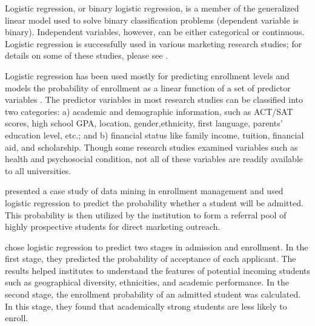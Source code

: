 \documentclass[12pt,english]{report}
\begin{document}
Logistic regression, or binary logistic regression, is a member of the generalized linear model used to solve binary classification problems (dependent variable is binary). Independent variables, however,  can be either categorical or continuous. %
Logistic regression is successfully used in various marketing research studies; for details on some of these studies, please see \citep{Hosmer2013}.

\vspace{0.15in}
Logistic regression has been used mostly for predicting enrollment levels and models the probability of enrollment as a linear function of a set of predictor variables \citep{lr_summary}. The predictor  variables in most research studies can be classified into two categories: a) academic and demographic information, such as ACT/SAT scores, high school GPA, location, gender,ethnicity, first language, parents' education level, etc.; and b) financial status like family income, tuition, financial aid, and scholarship. Though some research studies examined variables such as health and psychosocial condition, not all of these variables are readily available to all universities.

\citet{lr_1_chang} presented a case study of data mining in enrollment management and used logistic regression to predict the probability whether a student will be admitted. This probability is then utilized by the institution to form a referral pool of highly prospective students for direct marketing outreach.

\citet{lr_2} chose logistic regression to predict two stages in admission and enrollment. In the first stage, they predicted the probability of acceptance of each applicant. The results helped institutes to understand the features of potential incoming students such as geographical diversity, ethnicities, and academic  performance. In the second stage, the enrollment probability of an admitted  student was calculated. In this stage, they found that academically strong students are less likely to enroll.
\end{document}

